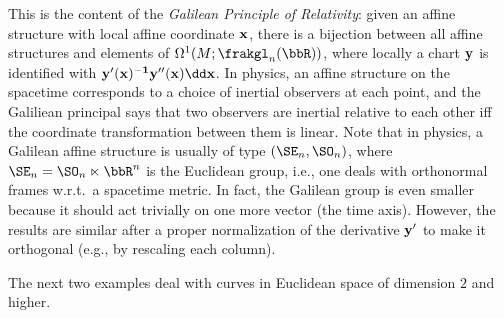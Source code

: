 \begin{example}
    This is the content of the \emph{Galilean Principle of Relativity}: given an affine structure with local affine coordinate $\bf{x}$, there is a bijection between all affine structures and elements of $\Omega^1(M;\frakgl_n(\bbR))$, where locally a chart $\bf{y}$ is identified with $\bf{y}'(\bf{x})^{-1}\bf{y}''(\bf{x})\dd \bf{x}$. In physics, an affine structure on the spacetime corresponds to a choice of inertial observers at each point, and the Galiliean principal says that two observers are inertial relative to each other iff the coordinate transformation between them is linear. Note that in physics, a Galilean affine structure is usually of type $(\SE_n,\SO_n)$, where $\SE_n=\SO_n\ltimes\bbR^n$ is the Euclidean group, i.e., one deals with orthonormal frames w.r.t.\ a spacetime metric. In fact, the Galilean group is even smaller because it should act trivially on one more vector (the time axis). However, the results are similar after a proper normalization of the derivative $\bf{y}'$ to make it orthogonal (e.g., by rescaling each column).
\end{example}

The next two examples deal with curves in Euclidean space of dimension $2$ and higher.

